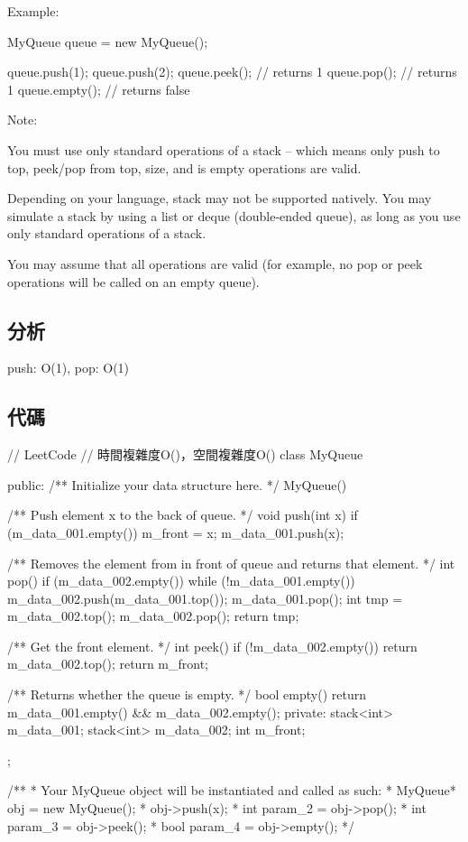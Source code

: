 Example:
\begin{Code}
MyQueue queue = new MyQueue();

queue.push(1);
queue.push(2);  
queue.peek();  // returns 1
queue.pop();   // returns 1
queue.empty(); // returns false
\end{Code}

Note:
\begindot
\item You must use only standard operations of a stack -- which means only push to top, peek/pop from top, size, and is empty operations are valid.
\item Depending on your language, stack may not be supported natively. You may simulate a stack by using a list or deque (double-ended queue), as long as you use only standard operations of a stack.
\item You may assume that all operations are valid (for example, no pop or peek operations will be called on an empty queue).
\myenddot

\subsection{分析}
push: O(1), pop: O(1)

\subsection{代碼}
\begin{Code}
// LeetCode
// 時間複雜度O()，空間複雜度O()
class MyQueue {
public:
    /** Initialize your data structure here. */
    MyQueue() {

    }

    /** Push element x to the back of queue. */
    void push(int x) {
        if (m_data_001.empty())
            m_front = x;
        m_data_001.push(x);
    }

    /** Removes the element from in front of queue and returns that element. */
    int pop() {
        if (m_data_002.empty())
            while (!m_data_001.empty())
            {
                m_data_002.push(m_data_001.top());
                m_data_001.pop();
            }
        int tmp = m_data_002.top();
        m_data_002.pop();
        return tmp;
    }

    /** Get the front element. */
    int peek() {
        if (!m_data_002.empty())
            return m_data_002.top();
        return m_front;
    }

    /** Returns whether the queue is empty. */
    bool empty() {
        return m_data_001.empty() && m_data_002.empty();
    }
private:
    stack<int> m_data_001;
    stack<int> m_data_002;
    int m_front;
};

/**
 * Your MyQueue object will be instantiated and called as such:
 * MyQueue* obj = new MyQueue();
 * obj->push(x);
 * int param_2 = obj->pop();
 * int param_3 = obj->peek();
 * bool param_4 = obj->empty();
 */
\end{Code}

